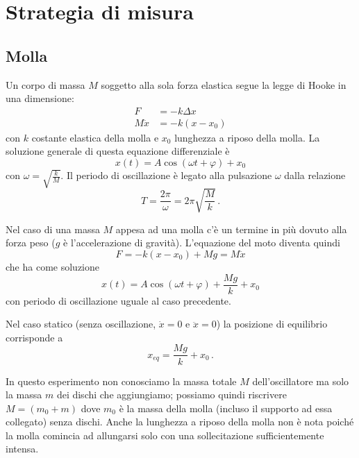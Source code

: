 \documentclass[titlepage]{article}
\numberwithin{equation}{section}
\numberwithin{figure}{section}
\numberwithin{table}{section}
\begin{document}
\section{Strategia di misura}

\subsection{Molla}

Un corpo di massa $M$ soggetto alla sola forza elastica segue la legge di Hooke in una dimensione:
\begin{align}
  F &= -k \Delta x \nonumber \\
  M \ddot{x} &= -k(x - x_0)
\end{align}
con $k$ costante elastica della molla e $x_0$ lunghezza a riposo della molla. La soluzione generale di questa equazione differenziale è
\begin{equation}
  x(t) = A \cos(\omega t + \varphi) + x_0
\end{equation}
con $\omega = \sqrt{\frac{k}{M}}$. Il periodo di oscillazione è legato alla pulsazione $\omega$ dalla relazione
\begin{equation}
  \label{eq:periodo1}
  T = \frac{2 \pi}{\omega} = 2 \pi \sqrt{\frac{M}{k}} \,.
\end{equation}

Nel caso di una massa $M$ appesa ad una molla c'è un termine in più dovuto alla forza peso ($g$ è l'accelerazione di gravità). L'equazione del moto diventa quindi
\begin{equation}
  F = -k(x - x_0) + Mg = M \ddot{x}
\end{equation}
che ha come soluzione
\begin{equation}
  x(t) = A \cos(\omega t + \varphi) + \frac{Mg}{k} + x_0
\end{equation}
con periodo di oscillazione uguale al caso precedente.

Nel caso statico (senza oscillazione, $\dot{x} = 0$ e $\ddot{x} = 0$) la posizione di equilibrio corrisponde a
\begin{equation}
  \label{eq:xeq}
  x_{eq} = \frac{Mg}{k} + x_0 \,.
\end{equation}

In questo esperimento non conosciamo la massa totale $M$ dell'oscillatore ma solo la massa $m$ dei dischi che aggiungiamo; possiamo quindi riscrivere $M = (m_0 + m)$ dove $m_0$ è la massa della molla (incluso il supporto ad essa collegato) senza dischi. Anche la lunghezza a riposo della molla non è nota poiché la molla comincia ad allungarsi solo con una sollecitazione sufficientemente intensa.
\end{document}
